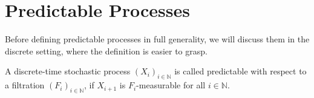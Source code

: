 \section{Predictable Processes}

Before defining predictable processes in full generality, we will discuss them in the discrete setting, where the definition is easier to grasp.

\begin{definition}
	A discrete-time stochastic process $(X_i)_{i\in\mathbb{N}}$ is called predictable with respect to a filtration $(F_i)_{i\in\mathbb{N}}$, if $X_{i + 1}$ is $F_i$-measurable for all $i \in \mathbb{N}$.
\end{definition}



